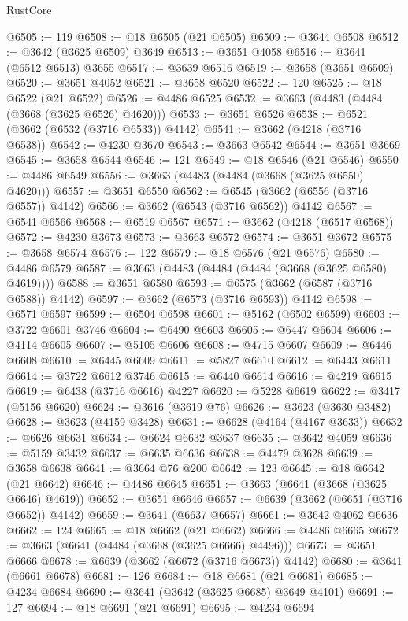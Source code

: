 \begin{lexlean}{RustCore}
\begin{coremodule}
@6505 := 119
@6508 := @18 @6505 (@21 @6505)
@6509 := @3644 @6508
@6512 := @3642 (@3625 @6509) @3649
@6513 := @3651 @4058
@6516 := @3641 (@6512 @6513) @3655
@6517 := @3639 @6516
@6519 := @3658 (@3651 @6509)
@6520 := @3651 @4052
@6521 := @3658 @6520
@6522 := 120
@6525 := @18 @6522 (@21 @6522)
@6526 := @4486 @6525
@6532 := @3663 (@4483 (@4484 (@3668 (@3625 @6526) @4620)))
@6533 := @3651 @6526
@6538 := @6521 (@3662 (@6532 (@3716 @6533)) @4142)
@6541 := @3662 (@4218 (@3716 @6538))
@6542 := @4230 @3670
@6543 := @3663 @6542
@6544 := @3651 @3669
@6545 := @3658 @6544
@6546 := 121
@6549 := @18 @6546 (@21 @6546)
@6550 := @4486 @6549
@6556 := @3663 (@4483 (@4484 (@3668 (@3625 @6550) @4620)))
@6557 := @3651 @6550
@6562 := @6545 (@3662 (@6556 (@3716 @6557)) @4142)
@6566 := @3662 (@6543 (@3716 @6562)) @4142
@6567 := @6541 @6566
@6568 := @6519 @6567
@6571 := @3662 (@4218 (@6517 @6568))
@6572 := @4230 @3673
@6573 := @3663 @6572
@6574 := @3651 @3672
@6575 := @3658 @6574
@6576 := 122
@6579 := @18 @6576 (@21 @6576)
@6580 := @4486 @6579
@6587 := @3663 (@4483 (@4484 (@4484 (@3668 (@3625 @6580) @4619))))
@6588 := @3651 @6580
@6593 := @6575 (@3662 (@6587 (@3716 @6588)) @4142)
@6597 := @3662 (@6573 (@3716 @6593)) @4142
@6598 := @6571 @6597
@6599 := @6504 @6598
@6601 := @5162 (@6502 @6599)
@6603 := @3722 @6601 @3746
@6604 := @6490 @6603
@6605 := @6447 @6604
@6606 := @4114 @6605
@6607 := @5105 @6606
@6608 := @4715 @6607
@6609 := @6446 @6608
@6610 := @6445 @6609
@6611 := @5827 @6610
@6612 := @6443 @6611
@6614 := @3722 @6612 @3746
@6615 := @6440 @6614
@6616 := @4219 @6615
@6619 := @6438 (@3716 @6616) @4227
@6620 := @5228 @6619
@6622 := @3417 (@5156 @6620)
@6624 := @3616 (@3619 @76)
@6626 := @3623 (@3630 @3482)
@6628 := @3623 (@4159 @3428)
@6631 := @6628 (@4164 (@4167 @3633))
@6632 := @6626 @6631
@6634 := @6624 @6632 @3637
@6635 := @3642 @4059
@6636 := @5159 @3432
@6637 := @6635 @6636
@6638 := @4479 @3628
@6639 := @3658 @6638
@6641 := @3664 @76 @200
@6642 := 123
@6645 := @18 @6642 (@21 @6642)
@6646 := @4486 @6645
@6651 := @3663 (@6641 (@3668 (@3625 @6646) @4619))
@6652 := @3651 @6646
@6657 := @6639 (@3662 (@6651 (@3716 @6652)) @4142)
@6659 := @3641 (@6637 @6657)
@6661 := @3642 @4062 @6636
@6662 := 124
@6665 := @18 @6662 (@21 @6662)
@6666 := @4486 @6665
@6672 := @3663 (@6641 (@4484 (@3668 (@3625 @6666) @4496)))
@6673 := @3651 @6666
@6678 := @6639 (@3662 (@6672 (@3716 @6673)) @4142)
@6680 := @3641 (@6661 @6678)
@6681 := 126
@6684 := @18 @6681 (@21 @6681)
@6685 := @4234 @6684
@6690 := @3641 (@3642 (@3625 @6685) @3649 @4101)
@6691 := 127
@6694 := @18 @6691 (@21 @6691)
@6695 := @4234 @6694

\end{coremodule}
\end{lexlean}
